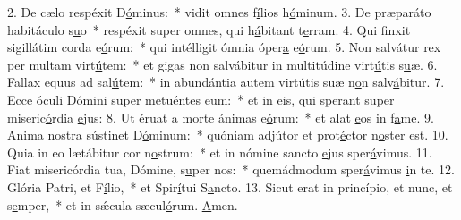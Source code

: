 2. De cælo respéxit D\uline{ó}minus:~* vidit omnes f\uline{í}lios h\uline{ó}minum.
3. De præparáto habitáculo s\uline{u}o~* respéxit super omnes, qui h\uline{á}bitant t\uline{e}rram.
4. Qui finxit sigillátim corda e\uline{ó}rum:~* qui intélligit ómnia óper\uline{a} e\uline{ó}rum.
5. Non salvátur rex per multam virt\uline{ú}tem:~* et gigas non salvábitur in multitúdine virt\uline{ú}tis s\uline{u}æ.
6. Fallax equus ad sal\uline{ú}tem:~* in abundántia autem virtútis suæ n\uline{o}n salv\uline{á}bitur.
7. Ecce óculi Dómini super metuéntes \uline{e}um:~* et in eis, qui sperant super miseric\uline{ó}rdia \uline{e}jus:
8. Ut éruat a morte ánimas e\uline{ó}rum:~* et alat \uline{e}os in f\uline{a}me.
9. Anima nostra sústinet D\uline{ó}minum:~* quóniam adjútor et prot\uline{é}ctor n\uline{o}ster est.
10. Quia in eo lætábitur cor n\uline{o}strum:~* et in nómine sancto \uline{e}jus sper\uline{á}vimus.
11. Fiat misericórdia tua, Dómine, s\uline{u}per nos:~* quemádmodum sper\uline{á}vimus \uline{i}n te.
12. Glória Patri, et F\uline{í}lio,~* et Spir\uline{í}tui S\uline{a}ncto.
13. Sicut erat in princípio, et nunc, et s\uline{e}mper,~* et in sǽcula sæcul\uline{ó}rum. \uline{A}men.
